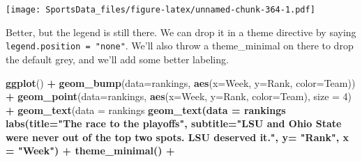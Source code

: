 \documentclass[
]{book}
\newenvironment{Shaded}{\begin{snugshade}}{\end{snugshade}}
\newcommand{\DataTypeTok}[1]{\textcolor[rgb]{0.13,0.29,0.53}{#1}}
\newcommand{\DecValTok}[1]{\textcolor[rgb]{0.00,0.00,0.81}{#1}}
\newcommand{\FloatTok}[1]{\textcolor[rgb]{0.00,0.00,0.81}{#1}}
\newcommand{\KeywordTok}[1]{\textcolor[rgb]{0.13,0.29,0.53}{\textbf{#1}}}
\newcommand{\NormalTok}[1]{#1}
\newcommand{\OperatorTok}[1]{\textcolor[rgb]{0.81,0.36,0.00}{\textbf{#1}}}
\newcommand{\StringTok}[1]{\textcolor[rgb]{0.31,0.60,0.02}{#1}}
\begin{document}
\texttt{[image: SportsData\_files/figure-latex/unnamed-chunk-364-1.pdf]}

Better, but the legend is still there. We can drop it in a theme directive by saying \texttt{legend.position\ =\ "none"}. We'll also throw a theme\_minimal on there to drop the default grey, and we'll add some better labeling.

\begin{Shaded}
\begin{Highlighting}[]
\KeywordTok{ggplot}\NormalTok{() }\OperatorTok{+}\StringTok{ }
\StringTok{  }\KeywordTok{geom_bump}\NormalTok{(}\DataTypeTok{data=}\NormalTok{rankings, }\KeywordTok{aes}\NormalTok{(}\DataTypeTok{x=}\NormalTok{Week, }\DataTypeTok{y=}\NormalTok{Rank, }\DataTypeTok{color=}\NormalTok{Team)) }\OperatorTok{+}\StringTok{ }
\StringTok{  }\KeywordTok{geom_point}\NormalTok{(}\DataTypeTok{data=}\NormalTok{rankings, }\KeywordTok{aes}\NormalTok{(}\DataTypeTok{x=}\NormalTok{Week, }\DataTypeTok{y=}\NormalTok{Rank, }\DataTypeTok{color=}\NormalTok{Team), }\DataTypeTok{size =} \DecValTok{4}\NormalTok{) }\OperatorTok{+}\StringTok{   }
\StringTok{  }\KeywordTok{geom_text}\NormalTok{(}\DataTypeTok{data =}\NormalTok{ rankings }\OperatorTok{%
\StringTok{  }\KeywordTok{geom_text}\NormalTok{(}\DataTypeTok{data =}\NormalTok{ rankings }\OperatorTok{%
\StringTok{  }\KeywordTok{labs}\NormalTok{(}\DataTypeTok{title=}\StringTok{"The race to the playoffs"}\NormalTok{, }\DataTypeTok{subtitle=}\StringTok{"LSU and Ohio State were never out of the top two spots. LSU deserved it."}\NormalTok{, }\DataTypeTok{y=} \StringTok{"Rank"}\NormalTok{, }\DataTypeTok{x =} \StringTok{"Week"}\NormalTok{) }\OperatorTok{+}
\StringTok{  }\KeywordTok{theme_minimal}\NormalTok{() }\OperatorTok{+}
}}
\end{Highlighting}
\end{Shaded}
\end{document}

